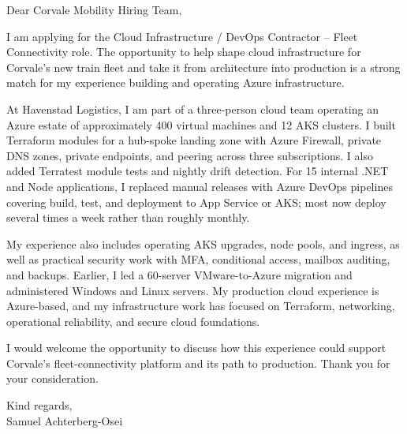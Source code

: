 \documentclass[11pt,a4paper]{article}
\begin{document}
\noindent Dear Corvale Mobility Hiring Team,

I am applying for the Cloud Infrastructure / DevOps Contractor -- Fleet Connectivity role. The opportunity to help shape cloud infrastructure for Corvale’s new train fleet and take it from architecture into production is a strong match for my experience building and operating Azure infrastructure.

At Havenstad Logistics, I am part of a three-person cloud team operating an Azure estate of approximately 400 virtual machines and 12 AKS clusters. I built Terraform modules for a hub-spoke landing zone with Azure Firewall, private DNS zones, private endpoints, and peering across three subscriptions. I also added Terratest module tests and nightly drift detection. For 15 internal .NET and Node applications, I replaced manual releases with Azure DevOps pipelines covering build, test, and deployment to App Service or AKS; most now deploy several times a week rather than roughly monthly.

My experience also includes operating AKS upgrades, node pools, and ingress, as well as practical security work with MFA, conditional access, mailbox auditing, and backups. Earlier, I led a 60-server VMware-to-Azure migration and administered Windows and Linux servers. My production cloud experience is Azure-based, and my infrastructure work has focused on Terraform, networking, operational reliability, and secure cloud foundations.

I would welcome the opportunity to discuss how this experience could support Corvale’s fleet-connectivity platform and its path to production. Thank you for your consideration.

Kind regards,\\
Samuel Achterberg-Osei
\end{document}
